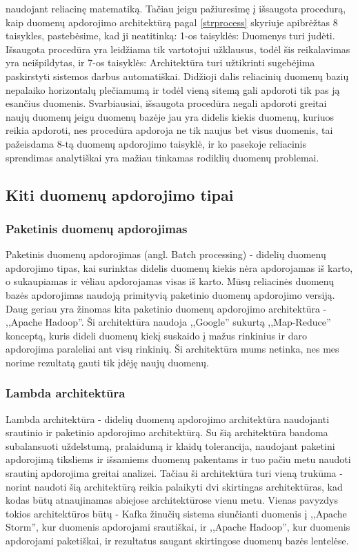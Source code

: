 \documentclass{VUMIFPSkursinis}
\begin{document}
    naudojant reliacinę matematiką. Tačiau jeigu pažiuresimę į išsaugota procedurą, kaip duomenų apdorojimo architektūrą pagal \ref{strprocess} skyriuje apibrėžtas 8 taisykles, 
    pastebėsime, kad ji neatitinką: 1-os taisyklės: Duomenys turi judėti. Išsaugota procedūra yra leidžiama tik vartotojui užklausus, todėl šis reikalavimas yra neišpildytas, 
    ir 7-os taisyklės: Architektūra turi užtikrinti sugebėjima paskirstyti sistemos darbus automatiškai. Didžioji dalis reliacinių duomenų bazių nepalaiko horizontalų 
    plečiamumą\cite{cattelsql, jkubas} ir todėl vieną sitemą gali apdoroti tik pas ją esančius duomenis. Svarbiausiai, išsaugota procedūra negali apdoroti greitai naujų duomenų jeigu duomenų bazėje 
    jau yra didelis kiekis duomenų, kuriuos reikia apdoroti, nes procedūra apdoroja ne tik naujus bet visus duomenis, tai pažeisdama 8-tą duomenų apdorojimo taisyklė,
    ir ko pasekoje reliacinis sprendimas analytiškai yra mažiau tinkamas rodiklių duomenų problemai.

\subsection{Kiti duomenų apdorojimo tipai}

\subsubsection{Paketinis duomenų apdorojimas}

Paketinis duomenų apdorojimas (angl. Batch processing) - didelių duomenų apdorojimo tipas, kai surinktas didelis duomenų kiekis nėra apdorojamas iš karto, o sukaupiamas ir vėliau apdorojamas visas iš karto. 
Mūsų reliacinės duomenų bazės apdorojimas naudoją primityvią paketinio duomenų apdorojimo versiją. Daug geriau yra žinomas kita paketinio duomenų apdorojimo architektūra - ,,Apache Hadoop''. Ši architektūra
naudoja ,,Google'' sukurtą ,,Map-Reduce'' konceptą\cite{dean2008mapreduce}, kuris dideli duomenų kiekį suskaido į mažus rinkinius ir daro apdorojima paraleliai ant visų rinkinių.\cite{batchProcessing} Ši architektūra mums netinka, nes mes norime rezultatą 
gauti tik įdėję naujų duomenų.

\subsubsection{Lambda architektūra}

Lambda architektūra - didelių duomenų apdorojimo architektūra naudojanti srautinio ir paketinio apdorojimo architektūrą. Su šią architektūra bandoma subalansuoti uždelstumą, pralaidumą ir klaidų tolerancija, naudojant 
paketini apdorojimą tiksliems ir išsamiems duomenų pakentams ir tuo pačiu metu naudoti srautinį apdorojima greitai analizei\cite{hasani2014lambda}. Tačiau ši architektūra turi vieną trukūma - norint naudoti šią architektūrą
reikia palaikyti dvi skirtingas architektūras, kad kodas būtų atnaujinamas abiejose architektūrose vienu metu\cite{kreps2014questioning}. Vienas pavyzdys tokios architektūros būtų - Kafka žinučių sistema siunčianti duomenis į ,,Apache Storm'', 
kur duomenis apdorojami srautiškai, ir ,,Apache Hadoop'', kur duomenis apdorojami paketiškai, ir rezultatus saugant skirtingose duomenų bazės lentelėse.
\end{document}
